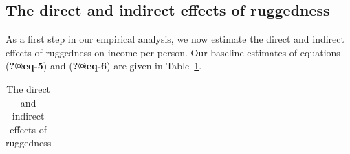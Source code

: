 \documentclass[
  letterpaper,
  DIV=11,
  numbers=noendperiod]{scrartcl}
\begin{document}
\subsection{The direct and indirect effects of ruggedness}\label{sec-4}

As a first step in our empirical analysis, we now estimate the direct
and indirect effects of ruggedness on income per person. Our baseline
estimates of equations (\textbf{?@eq-5}) and (\textbf{?@eq-6}) are given
in Table~\ref{tbl-1}.

\begin{longtable}[]{@{}
  >{\raggedright\arraybackslash}p{}
  >{\raggedright\arraybackslash}p{}
  >{\raggedright\arraybackslash}p{}
  >{\raggedright\arraybackslash}p{}
  >{\raggedright\arraybackslash}p{}
  >{\raggedright\arraybackslash}p{}
  >{\raggedright\arraybackslash}p{}
  >{\raggedright\arraybackslash}p{}@{}}

\caption{\label{tbl-1}The direct and indirect effects of ruggedness}

\tabularnewline


\end{longtable}
\end{document}

